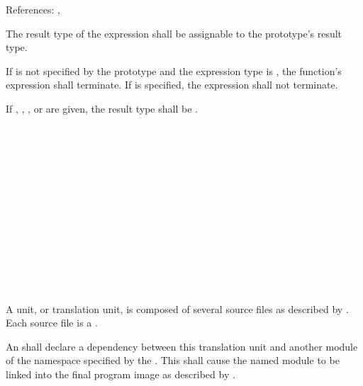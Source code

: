 References: , 

\specsubsubitem
The result type of the expression shall be assignable to the prototype's result
type.

\specsubsubitem
If  is not specified by the prototype and the expression
type is , the function's expression shall
terminate. If  is specified, the expression shall not
terminate.

\specsubsubitem
If , , , or
 are given, the result type shall be .


\begin{grammar}
\\
	 \\

\\
	\\
	 \\

\\
	  \terminal{;}\\
	  \terminal{=}  \terminal{;}\\
	  \terminal{::} \terminal{\{}  \terminal{\}} \terminal{;}\\

\\
	 \optional{\terminal{,}}\\
	 \terminal{,} \\
\end{grammar}

\specsubitem
A unit, or translation unit, is composed of several source files as described
by . Each source file is a .

\specsubitem
An  shall declare a dependency between this translation
unit and another module of the namespace specified by the
 . This shall cause the named
module to be linked into the final program image as described by
.

